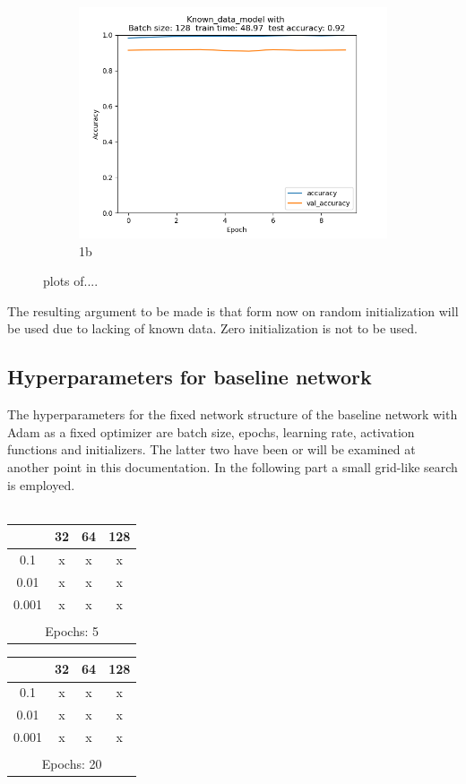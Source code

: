 \documentclass{article}
\begin{document}
\begin{multicols}{2}
\begin{figure}[h!]
\begin{subfigure}{.3\textwidth}
		\includegraphics[width=\linewidth]{../img_1_1_init/acc_plot_Known_data_model}
		\caption{1b}
		\label{fig:sfig2}
	\end{subfigure}
	\caption{plots of....}
	\label{fig:fig}
\end{figure}
The resulting argument to be made is that form now on random initialization will be used due to lacking of known data. Zero initialization is not to be used.

\subsection{Hyperparameters for baseline network}
The hyperparameters for the fixed network structure of the baseline network with Adam as a fixed optimizer are batch size, epochs, learning rate, activation functions and initializers. The latter two have been or will be examined at another point in this documentation. In the following part a small grid-like search is employed.\\
\\
\begin{centering}
	\begin{tabular}{c c c c}
		 & 32 & 64 & 128 \\
		\toprule[2pt]
		0.1 & x  & x & x \\
		\midrule[0.2pt]
		0.01 & x  & x & x \\
		\midrule[0.2pt]
		0.001 & x  & x & x \\
		\bottomrule[2pt]\\
		\multicolumn{4}{c}{Epochs: 5}
	\end{tabular}
	\hfill
	\begin{tabular}{c c c c}
		& 32 & 64 & 128 \\
		\toprule[2pt]
		0.1 & x  & x & x \\
		\midrule[0.2pt]
		0.01 & x  & x & x \\
		\midrule[0.2pt]
		0.001 & x  & x & x \\
		\bottomrule[2pt]\\
		\multicolumn{4}{c}{Epochs: 20}
	\end{tabular}
\end{centering}




\end{multicols}
\end{document}
